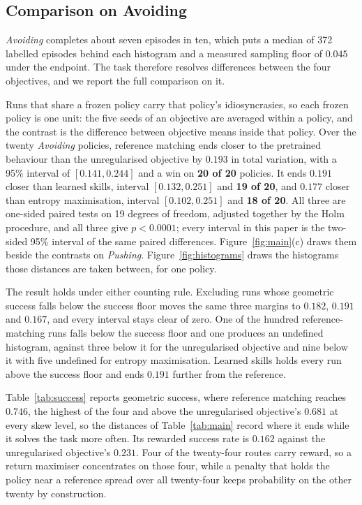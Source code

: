 \documentclass[preprint,12pt]{elsarticle}
\begin{document}
\subsection{Comparison on Avoiding}\label{sec:main}

\emph{Avoiding} completes about seven episodes in ten, which puts a median of
372 labelled episodes behind each histogram and a measured sampling floor of
$0.045$ under the endpoint. The task therefore resolves differences between the four
objectives, and we report the full comparison on it.

Runs that share a frozen policy carry that policy's idiosyncrasies, so each
frozen policy is one unit: the five seeds of an objective are averaged within a policy, and the
contrast is the difference between objective means inside that policy. Over the
twenty \emph{Avoiding} policies, reference matching ends closer to the
pretrained behaviour than the unregularised objective by $0.193$ in total
variation, with a 95\% interval of $[0.141, 0.244]$ and a win on
\textbf{20 of 20} policies. It ends $0.191$ closer than learned skills,
interval $[0.132, 0.251]$ and \textbf{19 of 20}, and $0.177$ closer than
entropy maximisation, interval $[0.102, 0.251]$ and \textbf{18 of 20}. All
three are one-sided paired tests on 19 degrees of freedom, adjusted together by
the Holm procedure, and all three give $p < 0.0001$; every interval in this
paper is the two-sided 95\% interval of the same paired differences. Figure~\ref{fig:main}(c)
draws them beside the contrasts on \emph{Pushing}. Figure~\ref{fig:histograms} draws the
histograms those distances are taken between, for one policy.

The result holds under either counting rule. Excluding runs whose
geometric success falls below the success floor moves the same three margins to
$0.182$, $0.191$ and $0.167$, and every interval stays clear of zero. One of the
hundred reference-matching runs falls below the success floor and one produces
an undefined histogram, against three below it for the unregularised
objective and nine below it with five undefined for entropy maximisation.
Learned skills holds every run above the success floor and ends $0.191$
further from the reference.

Table~\ref{tab:success} reports geometric success, where reference matching reaches
$0.746$, the highest of the four and above the unregularised objective's
$0.681$ at every skew level, so the distances of Table~\ref{tab:main} record
where it ends while it solves the task more often. Its rewarded success rate is
$0.162$ against the unregularised objective's $0.231$. Four of the twenty-four
routes carry reward, so a return maximiser concentrates on those four, while a
penalty that holds the policy near a reference spread over all twenty-four
keeps probability on the other twenty by construction.
\end{document}
